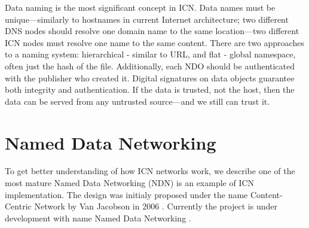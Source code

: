 Data naming is the most significant concept in ICN. Data names must be unique––similarly to hostnames in current Internet architecture; two different DNS nodes should resolve one domain name to the same location––two different ICN nodes must resolve one name to the same content. 
There are two approaches to a naming system: hierarchical - similar to URL, and flat - global namespace, often just the hash of the file.
Additionally, each NDO should be authenticated with the publisher who created it. Digital signatures on data objects guarantee both integrity and authentication. If the data is trusted, not the host, then the data can be served from any untrusted source––and we still can trust it.

\section{Named Data Networking}
To get better understanding of how ICN networks work, we describe one of the most mature 
Named Data Networking (NDN) is an example of ICN implementation. The design was initialy proposed under the name Content-Centric Network by Van Jacobson in 2006 \cite{4ANewWay38:online}. Currently the project is under development with name Named Data Networking \cite{NamedDat22:online}. 

